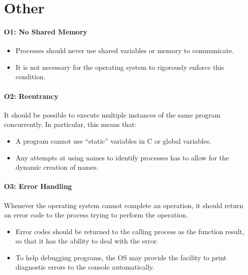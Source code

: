 \section{Other}

\paragraph*{O1: No Shared Memory}

\begin{itemize}
  \item Processes should never use shared variables or memory to communicate.
  \item  It is not necessary for the operating system to rigorously enforce this condition.
\end{itemize}

\paragraph*{O2: Reentrancy}

It should be possible to execute multiple instances of the same program concurrently. In particular, this means that:

\begin{itemize}
  \item A program cannot use ``static'' variables in C or global variables.
  \item  Any attempts at using names to identify processes has to allow for the dynamic creation of names.
\end{itemize}

\paragraph*{O3: Error Handling}
Whenever the operating system cannot complete an operation, it should return an error code to the process trying to perform the operation.

\begin{itemize}
  \item Error codes should be returned to the calling process as the function result, so that it has the ability to deal with the error.
  \item  To help debugging programs, the OS may provide the facility to print diagnostic errors to the console automatically.
\end{itemize}

